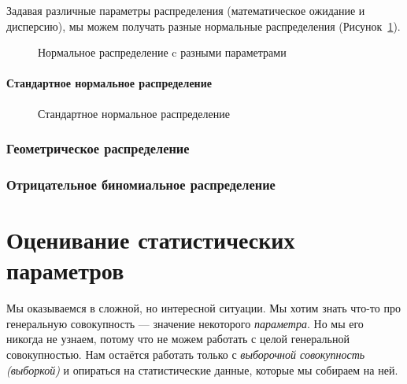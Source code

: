 \documentclass[
  letterpaper,
  DIV=11,
  numbers=noendperiod]{scrreprt}
\theoremstyle{definition}
\theoremstyle{remark}
\begin{document}
Задавая различные параметры распределения (математическое ожидание и
дисперсию), мы можем получать разные нормальные распределения
(Рисунок~\ref{fig-norms}).

\begin{figure}


\caption{\label{fig-norms}Нормальное распределение c разными
параметрами}

\end{figure}%

\subsubsection{Стандартное нормальное
распределение}\label{stats-rand-values-stnorm}

\begin{figure}


\caption{\label{fig-stnorm}Стандартное нормальное распределение}

\end{figure}%

\subsection{Геометрическое распределение}\label{stats-rand-values-geom}

\subsection{Отрицательное биномиальное
распределение}\label{stats-rand-values-negbinom}


\chapter{Оценивание статистических параметров}\label{stats-estim}

Мы оказываемся в сложной, но интересной ситуации. Мы хотим знать что-то
про генеральную совокупность --- значение некоторого \emph{параметра}.
Но мы его никогда не узнаем, потому что не можем работать с целой
генеральной совокупностью. Нам остаётся работать только с
\emph{выборочной совокупность (выборкой)} и опираться на статистические
данные, которые мы собираем на ней.
\end{document}
